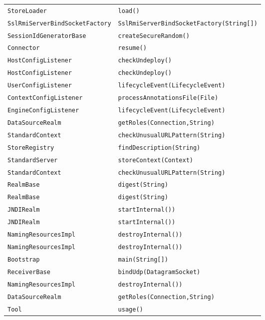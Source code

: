 \begin{center}
\begin{longtable}{ll}
\lstinline/StoreLoader/&{\lstinline/load()/}\\
\lstinline/SslRmiServerBindSocketFactory/&{\lstinline/SslRmiServerBindSocketFactory(String[])/}\\
\lstinline/SessionIdGeneratorBase/&{\lstinline/createSecureRandom()/}\\
\lstinline/Connector/&{\lstinline/resume()/}\\
\lstinline/HostConfigListener/&{\lstinline/checkUndeploy()/}\\
\lstinline/HostConfigListener/&{\lstinline/checkUndeploy()/}\\
\lstinline/UserConfigListener/&{\lstinline/lifecycleEvent(LifecycleEvent)/}\\
\lstinline/ContextConfigListener/&{\lstinline/processAnnotationsFile(File)/}\\
\lstinline/EngineConfigListener/&{\lstinline/lifecycleEvent(LifecycleEvent)/}\\
\lstinline/DataSourceRealm/&{\lstinline/getRoles(Connection,String)/}\\
\lstinline/StandardContext/&{\lstinline/checkUnusualURLPattern(String)/}\\
\lstinline/StoreRegistry/&{\lstinline/findDescription(String)/}\\
\lstinline/StandardServer/&{\lstinline/storeContext(Context)/}\\
\lstinline/StandardContext/&{\lstinline/checkUnusualURLPattern(String)/}\\
\lstinline/RealmBase/&{\lstinline/digest(String)/}\\
\lstinline/RealmBase/&{\lstinline/digest(String)/}\\
\lstinline/JNDIRealm/&{\lstinline/startInternal())/}\\
\lstinline/JNDIRealm/&{\lstinline/startInternal())/}\\
\lstinline/NamingResourcesImpl/&{\lstinline/destroyInternal())/}\\
\lstinline/NamingResourcesImpl/&{\lstinline/destroyInternal())/}\\
\lstinline/Bootstrap/&{\lstinline/main(String[])/}\\
\lstinline/ReceiverBase/&{\lstinline/bindUdp(DatagramSocket)/}\\
\lstinline/NamingResourcesImpl/&{\lstinline/destroyInternal())/}\\
\lstinline/DataSourceRealm/&{\lstinline/getRoles(Connection,String)/}\\
\lstinline/Tool/&{\lstinline/usage()/}\\

\end{longtable}
\end{center}
